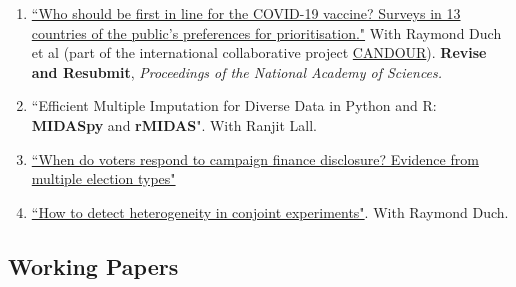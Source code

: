 \documentclass[11pt, a4paper]{article}
\begin{document}
\begin{enumerate}

  \item \href{https://doi.org/10.1101/2021.01.31.21250866}{``Who should be first in line for the COVID-19 vaccine? Surveys in 13 countries of the public’s preferences for prioritisation."} With Raymond Duch et al (part of the international collaborative project \href{https://oxford-candour.com/}{CANDOUR}). \textbf{Revise and Resubmit}, \textit{Proceedings of the National Academy of Sciences.}

  \item ``Efficient Multiple Imputation for Diverse Data in Python and R: \textbf{MIDASpy} and \textbf{rMIDAS}". With Ranjit Lall.

\item \href{https://ts-robinson.com/publication/robinson-whenvotersrespond-2021/robinson-whenvotersrespond-2021.pdf}{``When do voters respond to campaign finance disclosure? Evidence from multiple election types"}

\item \href{https://ts-robinson.com/publication/robinson-conjoint-2021/robinson-conjoint-2021.pdf}{``How to detect heterogeneity in conjoint experiments"}.  With Raymond Duch.
\end{enumerate}

\subsection*{Working Papers}
\end{document}

